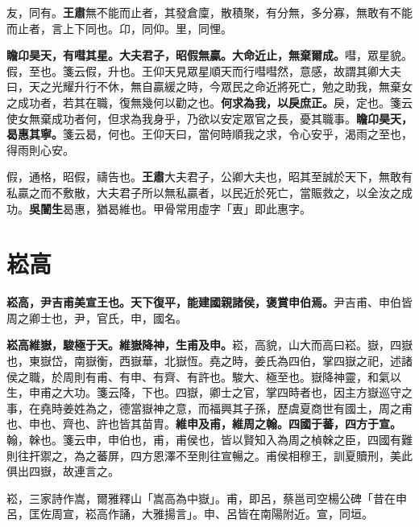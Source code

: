 \begin{quoting}友，同有。\textbf{王肅}無不能而止者，其發倉廩，散積聚，有分無，多分寡，無敢有不能而止者，言上下同也。卬，同仰。里，同悝。\end{quoting}

\textbf{瞻卬昊天，有嘒其星。大夫君子，昭假無贏。大命近止，無棄爾成。}{\footnotesize 嘒，眾星貌。假，至也。箋云假，升也。王仰天見眾星順天而行嘒嘒然，意感，故謂其卿大夫曰，天之光耀升行不休，無自贏緩之時，今眾民之命近將死亡，勉之助我，無棄女之成功者，若其在職，復無幾何以勸之也。}\textbf{何求為我，以戾庶正。}{\footnotesize 戾，定也。箋云使女無棄成功者何，但求為我身乎，乃欲以安定眾官之長，憂其職事。}\textbf{瞻卬昊天，曷惠其寧。}{\footnotesize 箋云曷，何也。王仰天曰，當何時順我之求，令心安乎，渴雨之至也，得雨則心安。}

\begin{quoting}假，通格，昭假，禱告也。\textbf{王肅}大夫君子，公卿大夫也，昭其至誠於天下，無敢有私贏之而不敷散，大夫君子所以無私贏者，以民近於死亡，當賑救之，以全汝之成功。\textbf{吳闓生}曷惠，猶曷維也。甲骨常用虛字「叀」即此惠字。\end{quoting}

\section{崧高}


\textbf{崧高，尹吉甫美宣王也。天下復平，能建國親諸侯，褒賞申伯焉。}{\footnotesize 尹吉甫、申伯皆周之卿士也，尹，官氏，申，國名。}

\textbf{崧高維嶽，駿極于天。維嶽降神，生甫及申。}{\footnotesize 崧，高貌，山大而高曰崧。嶽，四嶽也，東嶽岱，南嶽衡，西嶽華，北嶽恆。堯之時，姜氏為四伯，掌四嶽之祀，述諸侯之職，於周則有甫、有申、有齊、有許也。駿大、極至也。嶽降神靈，和氣以生，申甫之大功。箋云降，下也。四嶽，卿士之官，掌四時者也，因主方嶽巡守之事，在堯時姜姓為之，德當嶽神之意，而福興其子孫，歷虞夏商世有國土，周之甫也、申也、齊也、許也皆其苗胄。}\textbf{維申及甫，維周之翰。四國于蕃，四方于宣。}{\footnotesize 翰，榦也。箋云申，申伯也，甫，甫侯也，皆以賢知入為周之楨榦之臣，四國有難則往扞禦之，為之蕃屏，四方恩澤不至則往宣暢之。甫侯相穆王，訓夏贖刑，美此俱出四嶽，故連言之。}

\begin{quoting}崧，三家詩作嵩，爾雅釋山「嵩高為中嶽」。甫，即呂，蔡邕司空楊公碑「昔在申呂，匡佐周宣，崧高作誦，大雅揚言」。申、呂皆在南陽附近。宣，同垣。\end{quoting}

